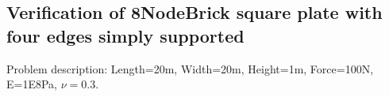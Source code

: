 \documentclass[fleqn,11pt]{article}
\begin{document}

















\newpage
\subsection{Verification of 8NodeBrick square plate with four edges simply supported}

Problem description: Length=20m, Width=20m, Height=1m, Force=100N, E=1E8Pa, $\nu=0.3$. 
\end{document}
